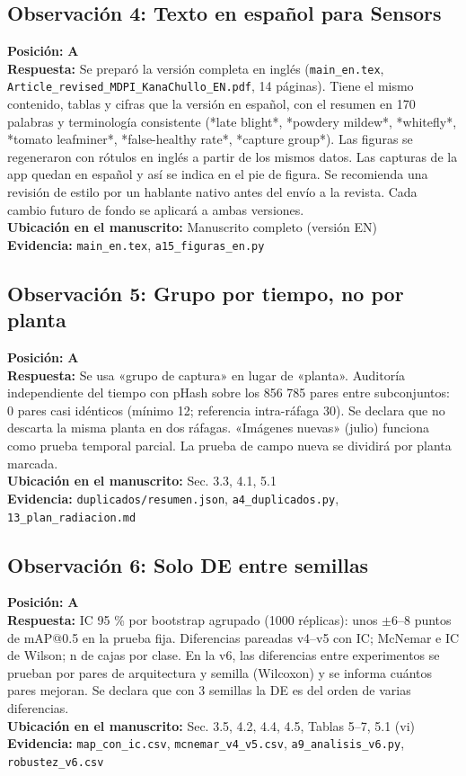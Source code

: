 \documentclass[11pt,a4paper]{article}
\begin{document}
\subsection*{Observación 4: Texto en español para Sensors}
\noindent\textbf{Posición:} \textbf{A}\\
\textbf{Respuesta:} Se preparó la versión completa en inglés (\texttt{main\_en.tex}, \texttt{Article\_revised\_MDPI\_KanaChullo\_EN.pdf}, 14 páginas). Tiene el mismo contenido, tablas y cifras que la versión en español, con el resumen en 170 palabras y terminología consistente (*late blight*, *powdery mildew*, *whitefly*, *tomato leafminer*, *false-healthy rate*, *capture group*). Las figuras se regeneraron con rótulos en inglés a partir de los mismos datos. Las capturas de la app quedan en español y así se indica en el pie de figura. Se recomienda una revisión de estilo por un hablante nativo antes del envío a la revista. Cada cambio futuro de fondo se aplicará a ambas versiones.\\
\textbf{Ubicación en el manuscrito:} Manuscrito completo (versión EN)\\
\textbf{Evidencia:} \texttt{main\_en.tex}, \texttt{a15\_figuras\_en.py}

\subsection*{Observación 5: Grupo por tiempo, no por planta}
\noindent\textbf{Posición:} \textbf{A}\\
\textbf{Respuesta:} Se usa «grupo de captura» en lugar de «planta». Auditoría independiente del tiempo con pHash sobre los 856 785 pares entre subconjuntos: 0 pares casi idénticos (mínimo 12; referencia intra-ráfaga 30). Se declara que no descarta la misma planta en dos ráfagas. «Imágenes nuevas» (julio) funciona como prueba temporal parcial. La prueba de campo nueva se dividirá por planta marcada.\\
\textbf{Ubicación en el manuscrito:} Sec. 3.3, 4.1, 5.1\\
\textbf{Evidencia:} \texttt{duplicados/resumen.json}, \texttt{a4\_duplicados.py}, \texttt{13\_plan\_radiacion.md}

\subsection*{Observación 6: Solo DE entre semillas}
\noindent\textbf{Posición:} \textbf{A}\\
\textbf{Respuesta:} IC 95 \% por bootstrap agrupado (1000 réplicas): unos $\pm$6–8 puntos de mAP@0.5 en la prueba fija. Diferencias pareadas v4–v5 con IC; McNemar e IC de Wilson; n de cajas por clase. En la v6, las diferencias entre experimentos se prueban por pares de arquitectura y semilla (Wilcoxon) y se informa cuántos pares mejoran. Se declara que con 3 semillas la DE es del orden de varias diferencias.\\
\textbf{Ubicación en el manuscrito:} Sec. 3.5, 4.2, 4.4, 4.5, Tablas 5–7, 5.1 (vi)\\
\textbf{Evidencia:} \texttt{map\_con\_ic.csv}, \texttt{mcnemar\_v4\_v5.csv}, \texttt{a9\_analisis\_v6.py}, \texttt{robustez\_v6.csv}
\end{document}
